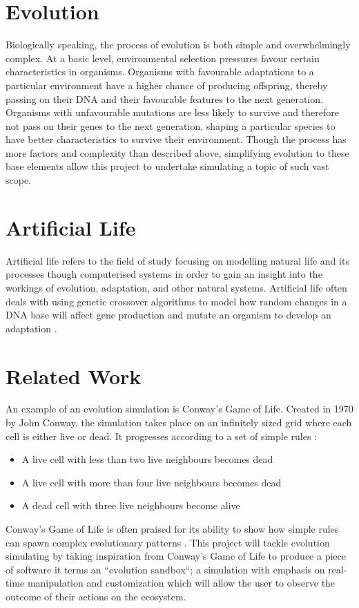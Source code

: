 \documentclass[a4paper, oneside, 11pt]{report}
\begin{document}
\section{Evolution}
Biologically speaking, the process of evolution is both simple and overwhelmingly complex. At a basic level, environmental selection pressures favour certain characteristics in organisms. Organisms with favourable adaptations to a particular environment have a higher chance of producing offspring, thereby passing on their DNA and their favourable features to the next generation. Organisms with unfavourable mutations are less likely to survive and therefore not pass on their genes to the next generation, shaping a particular species to have better characteristics to survive their environment. Though the process has more factors and complexity than described above, simplifying evolution to these base elements allow this project to undertake simulating a topic of such vast scope.

\section{Artificial Life}
Artificial life refers to the field of study focusing on modelling natural life and its processes though computerised systems in order to gain an insight into the workings of evolution, adaptation, and other natural systems. Artificial life often deals with using genetic crossover algorithms to model how random changes in a DNA base will affect gene production and mutate an organism to develop an adaptation \cite{grand}.

\section{Related Work}
An example of an evolution simulation is Conway's Game of Life. Created in 1970 by John Conway, the simulation takes place on an infinitely sized grid where each cell is either live or dead. It progresses according to a set of simple rules \cite{guardian}:
\begin{itemize}
	\item A live cell with less than two live neighbours becomes dead
	\item A live cell with more than four live neighbours becomes dead
	\item A dead cell with three live neighbours become alive
\end{itemize}

Conway's Game of Life is often praised for its ability to show how simple rules can spawn complex evolutionary patterns \cite{callahan}. This project will tackle evolution simulating by taking inspiration from Conway's Game of Life to produce a piece of software it terms an ``evolution sandbox``; a simulation with emphasis on real-time manipulation and customization which will allow the user to observe the outcome of their actions on the ecosystem.
\end{document}

